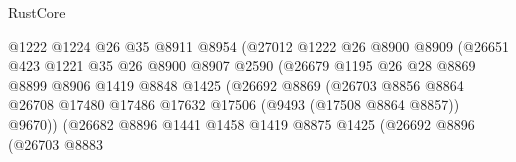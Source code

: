 \begin{lexlean}{RustCore}
\begin{coremodule}
                                      @1222
                                      @1224
                                      @26
                                      @35
                                      @8911
                                      @8954
                                      (@27012
                                        @1222
                                        @26
                                        @8900
                                        @8909
                                        (@26651
                                          @423
                                          @1221
                                          @35
                                          @26
                                          @8900
                                          @8907
                                          @2590
                                          (@26679
                                            @1195
                                            @26
                                            @28
                                            @8869
                                            @8899
                                            @8906
                                            @1419
                                            @8848
                                            @1425
                                            (@26692
                                              @8869
                                              (@26703
                                                @8856
                                                @8864
                                                @26708
                                                @17480
                                                @17486
                                                @17632
                                                @17506
                                                (@9493 (@17508 @8864 @8857))
                                                @9670))
                                            (@26682
                                              @8896
                                              @1441
                                              @1458
                                              @1419
                                              @8875
                                              @1425
                                              (@26692
                                                @8896
                                                (@26703
                                                  @8883

\end{coremodule}
\end{lexlean}
